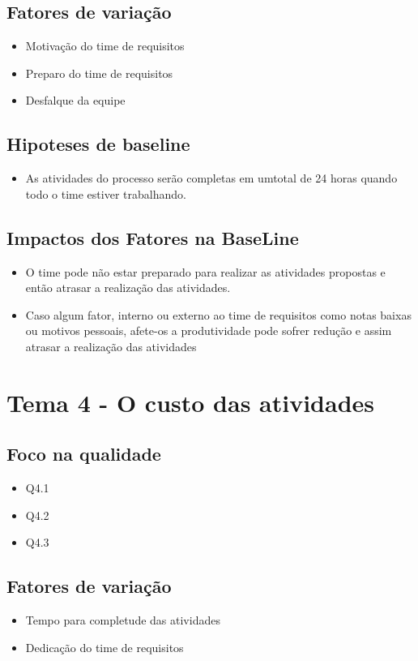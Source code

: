 	\subsection{Fatores de variação}
		\begin{itemize}  
		\item Motivação do time de requisitos
		\item Preparo do time de requisitos
		\item Desfalque da equipe
		\end{itemize}
	\subsection{Hipoteses de baseline}
		\begin{itemize}  
		\item As atividades do processo serão completas em umtotal de 24 horas quando todo o time estiver trabalhando.
		\end{itemize}
	\subsection{Impactos dos Fatores na BaseLine}
		\begin{itemize}  
		\item O time pode não estar preparado para realizar as atividades propostas e então atrasar a realização das atividades.
		\item Caso algum fator, interno ou externo ao time de requisitos como notas baixas ou motivos pessoais, afete-os a produtividade pode sofrer redução e assim atrasar a realização das atividades
		\end{itemize}


\section{Tema 4 - O custo das atividades}

	\subsection{Foco na qualidade}
		\begin{itemize}  
		\item Q4.1
		\item Q4.2
		\item Q4.3
		\end{itemize}
	\subsection{Fatores de variação}
		\begin{itemize}  
		\item Tempo para completude das atividades
		\item Dedicação do time de requisitos
		\end{itemize}
